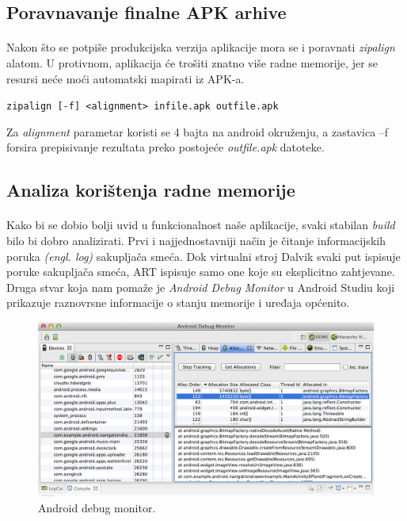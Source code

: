 \documentclass[times, utf8, zavrsni]{fer}
\begin{document}
\subsection{Poravnavanje finalne APK arhive}
\paragraph{}
Nakon što se potpiše produkcijska verzija aplikacije mora se i poravnati \textit{zipalign} alatom. U protivnom, aplikacija će trošiti znatno više radne memorije, jer se resursi neće moći automatski mapirati iz APK-a.

\begin{center}
\verb|zipalign [-f] <alignment> infile.apk outfile.apk|
\end{center}

Za \textit{alignment} parametar koristi se 4 bajta na android okruženju, a zastavica –f forsira prepisivanje rezultata preko postojeće \textit{outfile.apk} datoteke.

\subsection{Analiza korištenja radne memorije}
\paragraph{}
Kako bi se dobio bolji uvid u funkcionalnost naše aplikacije, svaki stabilan \textit{build} bilo bi dobro analizirati.
Prvi i najjednostavniji način je čitanje informacijskih poruka \textit{(engl. log)} sakupljača smeća. Dok virtualni stroj Dalvik svaki put ispisuje poruke sakupljača smeća, ART ispisuje samo one koje su eksplicitno zahtjevane.\\

Druga stvar koja nam pomaže je \textit{Android Debug Monitor} u Android Studiu koji prikazuje raznovrsne informacije o stanju memorije i uređaja općenito.\\

\begin{figure}[ht!]
\centering
\includegraphics[width=140mm]{img/android-debug-monitor.png}
\caption{Android debug monitor.}
\label{overflow}
\end{figure}
\end{document}
